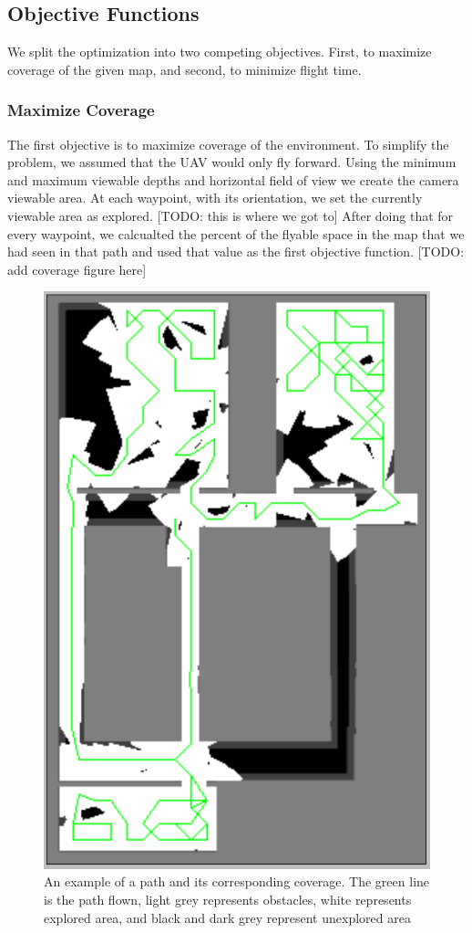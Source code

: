 \documentclass[letterpaper, 10 pt, conference]{ieeeconf}  %
\newcommand{\todo}[1]{{\color{blue}[TODO: #1]}}
\begin{document}
\subsection{Objective Functions}

We split the optimization into two competing objectives. First, to maximize coverage of the given map, and second, to minimize flight time.

\subsubsection{Maximize Coverage}

The first objective is to maximize coverage of the environment.  To simplify the problem, we assumed that the UAV would only fly forward. Using the minimum and maximum viewable depths and horizontal field of view  we create the camera viewable area. At each waypoint, with its orientation, we set the currently viewable area as explored. \todo{this is where we got to} After doing that for every waypoint, we calcualted the percent of the flyable space in the map that we had seen in that path and used that value as the first objective function. \todo{add coverage figure here}

\begin{figure}
\centering
\includegraphics[width=0.8\linewidth]{figures/coverage_map2.png}
\caption{An example of a path and its corresponding coverage. The green line is the path flown, light grey represents obstacles, white represents explored area, and black and dark grey represent unexplored area}
\label{fig:coverage}
\end{figure}
\end{document}
